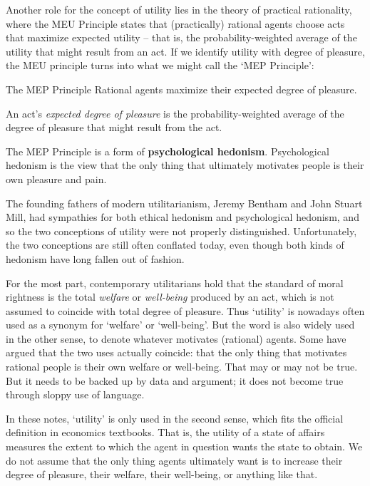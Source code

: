 Another role for the concept of utility lies in the theory of
practical rationality, where the MEU Principle states that
(practically) rational agents choose acts that maximize expected
utility -- that is, the probability-weighted average of the utility
that might result from an act. If we identify utility with degree of
pleasure, the MEU principle turns into what we might call the
`MEP Principle':
%
\begin{genericthm}{The MEP Principle}
  Rational agents maximize their expected degree of pleasure. 
\end{genericthm}
%
An act's \emph{expected degree of pleasure} is the
probability-weighted average of the degree of pleasure that might
result from the act. 

The MEP Principle is a form of \textbf{psychological
  hedonism}. Psychological hedonism is the view that the only thing
that ultimately motivates people is their own pleasure and pain.

The founding fathers of modern utilitarianism, Jeremy Bentham and John
Stuart Mill, had sympathies for both ethical hedonism and
psychological hedonism, and so the two conceptions of utility were not
properly distinguished. Unfortunately, the two conceptions are still
often conflated today, even though both kinds of hedonism have long
fallen out of fashion.

For the most part, contemporary utilitarians hold that the standard of
moral rightness is the total \emph{welfare} or \emph{well-being}
produced by an act, which is not assumed to coincide with total degree
of pleasure. Thus `utility' is nowadays often used as a synonym for
`welfare' or `well-being'. But the word is also widely used in the
other sense, to denote whatever motivates (rational) agents. Some have
argued that the two uses actually coincide: that the only thing that
motivates rational people is their own welfare or well-being. That may
or may not be true. But it needs to be backed up by data and argument;
it does not become true through sloppy use of language.

In these notes, `utility' is only used in the second sense, which fits
the official definition in economics textbooks. That is, the utility
of a state of affairs measures the extent to which the agent in
question wants the state to obtain. We do not assume that the only
thing agents ultimately want is to increase their degree of pleasure,
their welfare, their well-being, or anything like that.


